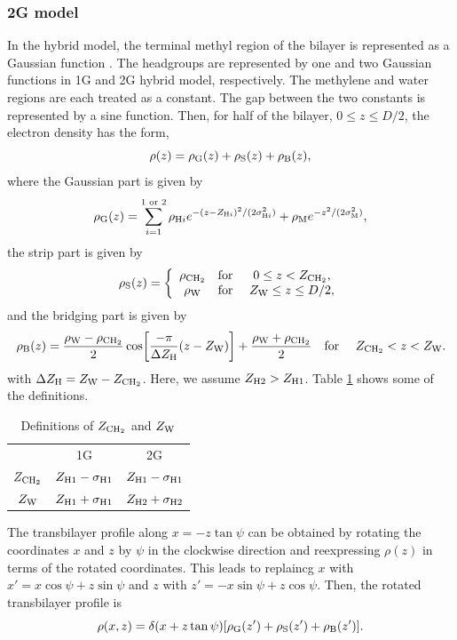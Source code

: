 \subsubsection{2G model}
In the hybrid model, the terminal methyl region of the bilayer is represented
as a Gaussian function \cite{ref:Wiener89}. The headgroups are represented by one 
and two Gaussian
functions in 1G and 2G hybrid model, respectively. The methylene and water 
regions are each treated as a constant. The gap between the two constants is 
represented by a sine function. Then, for half of the bilayer, 
$0 \leq z \leq D/2$, the electron density has the form, 
\begin{equation}
  \rho(z) = \rho_\mathrm{G}(z) + \rho_\mathrm{S}(z) + \rho_\mathrm{B}(z),
\end{equation}
where the Gaussian part is given by 
\begin{equation}
  \rho_\mathrm{G}(z) = \sum_{i=1}^{1\text{ or }2} \rho_{\mathrm{H}i}
             e^{-(z-Z_{\mathrm{H}i})^2/(2\sigma_{\mathrm{H}i}^2)} + \rho_\mathrm{M} e^{-z^2/(2\sigma_\mathrm{M}^2)},
\end{equation}
the strip part is given by
\begin{equation}
  \rho_\mathrm{S}(z) = \left\{
    \begin{array}{ccc}
      \rho_\mathrm{CH_2} & \text{for } & 0 \leq z < Z_\mathrm{CH_2}, \\
      \rho_\mathrm{W}   & \text{for } & Z_\mathrm{W} \leq z \leq D/2,
    \end{array}
  \right.
\end{equation}
and the bridging part is given by
\begin{equation}
  \rho_\mathrm{B}(z) = \frac{\rho_\mathrm{W}-\rho_\mathrm{CH_2}}{2} \cos \mathopen{}\left[ 
    \frac{-\pi}{\Delta Z_\mathrm{H}}(z-Z_\mathrm{W}) \right]\mathclose{} + \frac{\rho_\mathrm{W}+\rho_\mathrm{CH_2}}{2} \\
  \text{\quad for \quad} Z_\mathrm{CH_2} < z < Z_\mathrm{W}.
\end{equation}
with $\Delta Z_\mathrm{H}=Z_\mathrm{W}-Z_\mathrm{CH_2}$. Here, we assume $Z_{\mathrm{H}2}>Z_{\mathrm{H}1}$. 
Table \ref{tb:zchtwozw} shows some of the definitions.
\begin{table}[htb]
  \centering
  \begin{tabular}{c c c}
     & 1G & 2G \\
    $Z_\mathrm{CH_2}$ & $Z_{\mathrm{H}1}-\sigma_{\mathrm{H}1}$ & $Z_{\mathrm{H}1}-\sigma_{\mathrm{H}1}$ \\
    $Z_\mathrm{W}$ & $Z_{\mathrm{H}1}+\sigma_{\mathrm{H}1}$ & $Z_{\mathrm{H}2}+\sigma_{\mathrm{H}2}$   
  \end{tabular}
  \caption{Definitions of $Z_\mathrm{CH_2}$ and $Z_\mathrm{W}$}
  \label{tb:zchtwozw}
\end{table}
The transbilayer profile along $x=-z\tan\psi$ can be obtained by rotating
the coordinates $x$ and $z$ by $\psi$ in the clockwise direction and
reexpressing $\rho(z)$ in terms of the rotated coordinates. This leads
to replaincg $x$ with $x'=x\cos\psi+z\sin\psi$ and
$z$ with $z'=-x\sin\psi+z\cos\psi$. Then, the rotated transbilayer profile is
\begin{equation}
  \rho(x,z) = \delta(x+z\tan\psi)\mathopen{}\left[ \rho_\mathrm{G}(z') + \rho_\mathrm{S}(z') + \rho_\mathrm{B}(z') \right]\mathclose{}.
  \label{eq:rotated_profile}
\end{equation}

